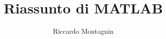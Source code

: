 \documentclass[12pt,a4paper,oneside]{book}
\begin{document}
\title{Riassunto di MATLAB}
\author{Riccardo Montagnin}
\date{}

\maketitle

\tableofcontents


\newpage

\newpage

\newpage

\newpage

\newpage

\newpage

\newpage

\end{document}
